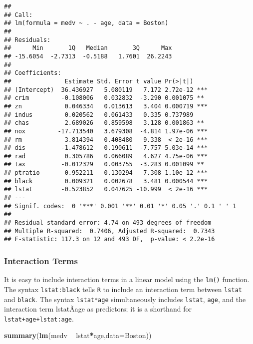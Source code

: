 \documentclass[]{article}
\newenvironment{Shaded}{\begin{snugshade}}{\end{snugshade}}
\newcommand{\KeywordTok}[1]{\textcolor[rgb]{0.13,0.29,0.53}{\textbf{#1}}}
\newcommand{\DataTypeTok}[1]{\textcolor[rgb]{0.13,0.29,0.53}{#1}}
\newcommand{\StringTok}[1]{\textcolor[rgb]{0.31,0.60,0.02}{#1}}
\newcommand{\OperatorTok}[1]{\textcolor[rgb]{0.81,0.36,0.00}{\textbf{#1}}}
\newcommand{\NormalTok}[1]{#1}
\begin{document}
\begin{verbatim}
## 
## Call:
## lm(formula = medv ~ . - age, data = Boston)
## 
## Residuals:
##      Min       1Q   Median       3Q      Max 
## -15.6054  -2.7313  -0.5188   1.7601  26.2243 
## 
## Coefficients:
##               Estimate Std. Error t value Pr(>|t|)    
## (Intercept)  36.436927   5.080119   7.172 2.72e-12 ***
## crim         -0.108006   0.032832  -3.290 0.001075 ** 
## zn            0.046334   0.013613   3.404 0.000719 ***
## indus         0.020562   0.061433   0.335 0.737989    
## chas          2.689026   0.859598   3.128 0.001863 ** 
## nox         -17.713540   3.679308  -4.814 1.97e-06 ***
## rm            3.814394   0.408480   9.338  < 2e-16 ***
## dis          -1.478612   0.190611  -7.757 5.03e-14 ***
## rad           0.305786   0.066089   4.627 4.75e-06 ***
## tax          -0.012329   0.003755  -3.283 0.001099 ** 
## ptratio      -0.952211   0.130294  -7.308 1.10e-12 ***
## black         0.009321   0.002678   3.481 0.000544 ***
## lstat        -0.523852   0.047625 -10.999  < 2e-16 ***
## ---
## Signif. codes:  0 '***' 0.001 '**' 0.01 '*' 0.05 '.' 0.1 ' ' 1
## 
## Residual standard error: 4.74 on 493 degrees of freedom
## Multiple R-squared:  0.7406, Adjusted R-squared:  0.7343 
## F-statistic: 117.3 on 12 and 493 DF,  p-value: < 2.2e-16
\end{verbatim}

\subsubsection{Interaction Terms}\label{interaction-terms}

It is easy to include interaction terms in a linear model using the
\texttt{lm()} function. The syntax \texttt{lstat:black} tells \texttt{R}
to include an interaction term between \texttt{lstat} and
\texttt{black}. The syntax \texttt{lstat*age} simultaneously includes
\texttt{lstat}, \texttt{age}, and the interaction term lstatÃage as
predictors; it is a shorthand for \texttt{lstat+age+lstat:age}.

\begin{Shaded}
\begin{Highlighting}[]
\KeywordTok{summary}\NormalTok{(}\KeywordTok{lm}\NormalTok{(medv }\OperatorTok{~}\StringTok{ }\NormalTok{lstat}\OperatorTok{*}\NormalTok{age,}\DataTypeTok{data=}\NormalTok{Boston))}
\end{Highlighting}
\end{Shaded}
\end{document}
